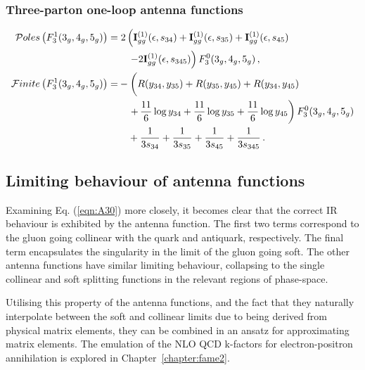 \documentclass[main.tex]{subfiles}
\begin{document}
    \subsubsection{Three-parton one-loop antenna functions}
    \begin{align}\label{eqn:F31}
        \mathcal{P}oles\left(F_{3}^{1}(3_{g},4_{g},5_{g})\right) =& \; 2\left(\mathbf{I}_{gg}^{(1)}(\epsilon,s_{34}) + \mathbf{I}_{gg}^{(1)}(\epsilon,s_{35}) + \mathbf{I}_{gg}^{(1)}(\epsilon,s_{45}) \right. \nonumber \\
        &\left. \quad -2\mathbf{I}_{gg}^{(1)}(\epsilon,s_{345})
        \right) F_{3}^{0}(3_{g},4_{g},5_{g}) \, , \\
        \mathcal{F}inite\left(F_{3}^{1}(3_{g},4_{g},5_{g})\right) =& -\left(R(y_{34},y_{35}) + R(y_{35},y_{45}) + R(y_{34},y_{45}) \vphantom{\dfrac{1}{1}} \right. \nonumber \\
        &\left. \quad + \, \dfrac{11}{6}\log{y_{34}} + \dfrac{11}{6}\log{y_{35}} + \dfrac{11}{6}\log{y_{45}} \right) F_{3}^{0}(3_{g},4_{g},5_{g}) \nonumber \\
        & \quad + \dfrac{1}{3s_{34}} + \dfrac{1}{3s_{35}} + \dfrac{1}{3s_{45}} + \dfrac{1}{3s_{345}} \, .
    \end{align}
    \subsection{Limiting behaviour of antenna functions}
    Examining Eq. (\ref{eqn:A30}) more closely, it becomes clear
    that the correct IR behaviour is exhibited by the antenna
    function. The first two terms correspond to the gluon
    going collinear with the quark and antiquark, respectively. The final
    term encapsulates the singularity in the limit of the gluon
    going soft.
    The other antenna functions have similar limiting behaviour,
    collapsing to the single collinear and soft splitting functions
    in the relevant regions of phase-space.

    Utilising this property of the antenna functions, and the fact
    that they naturally interpolate between the soft and collinear
    limits due to being derived from physical matrix elements,
    they can be combined in an ansatz for approximating
    matrix elements. The emulation of the NLO QCD k-factors
    for electron-positron annihilation is explored in Chapter~\ref{chapter:fame2}.
\end{document}

